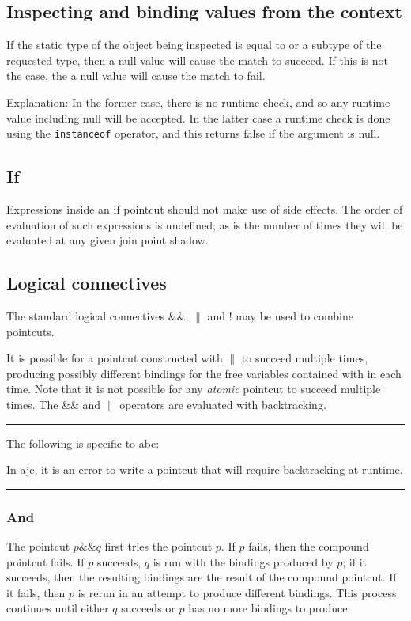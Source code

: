 \documentclass[12pt,a4paper]{report}
\newcommand\abcdistinctionbegin[0]{%
\hrule
\noindent
The following is specific to abc:

\noindent
}
\newcommand\abcdistinctionend[0]{%
\hrule
}
\def\ajand{\&\!\!\&}
\def\ajor{\|}
\def\ajnot{!}
\begin{document}
\subsection{Inspecting and binding values from the context}

If the static type of the object being inspected is equal to or a subtype of
the requested type, then a null value will cause the match to succeed.
If this is not the case, the a null value will cause the match to fail.

Explanation: In the former case, there is no runtime check, and so any
runtime value including null will be accepted. In the latter case a runtime
check is done using the \verb|instanceof| operator, and this returns false
if the argument is null.


\subsection{If}
Expressions inside an if pointcut should not make use of side effects. 
The order of evaluation of such expressions is undefined; as is the number
of times they will be evaluated at any given join point shadow.

\subsection{Logical connectives}

The standard logical connectives $\ajand$, $\ajor$ and $\ajnot$
may be used to combine pointcuts. 

It is possible for a pointcut
constructed with $\ajor$ to succeed multiple times, producing possibly 
different bindings for the free variables contained with in each time.
Note that it is not possible for any {\em atomic} pointcut to succeed
multiple times. The $\ajand$ and $\ajor$ operators are evaluated with
backtracking.

\abcdistinctionbegin
In ajc, it is an error to write a pointcut that will require backtracking
at runtime.
\abcdistinctionend

\subsubsection{And}

The pointcut $p\ajand q$ first tries the pointcut $p$. If $p$ fails, then the
compound pointcut fails. If $p$ succeeds, $q$ is run with the bindings
produced by $p$; if it succeeds, then the resulting bindings are the 
result of the compound pointcut. If it fails, then $p$ is rerun in an attempt
to produce different bindings. This process continues until either $q$
succeeds or $p$ has no more bindings to produce.
\end{document}
